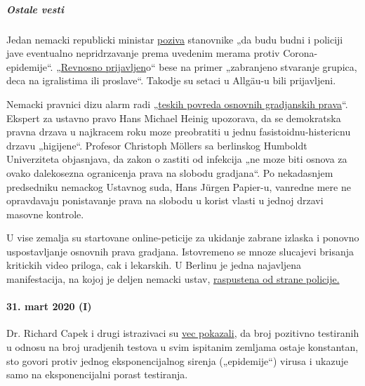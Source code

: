 \hypertarget{ostale-vesti}{%
\subparagraph{\texorpdfstring{\textbf{Ostale
vesti}}{Ostale vesti}}\label{ostale-vesti}}

Jedan nemacki republicki ministar
\href{https://de.nachrichten.yahoo.com/strobl-bürger-verstöße-gegen-corona-regeln-polizei-melden-095746341.html?guccounter=1\&guce_referrer=aHR0cHM6Ly9zd3Bycy5vcmcvY292aWQtMTkuaGlud2Vpcy1paS8\&guce_referrer_sig=AQAAAJVaaBhiC-cLtQEICEBkNWa4gI877p2SHKrJ-LrsojdMmHDRqmD1o16GD-gMGYWBcqEw1kotQgyNfK1u3rSR8nJWkkNBDaamOjNzpLUFAcU6MGRrpgxxWDyHz70vxqcw1sFwMu_EI0MbuHgRdzRFCEhV1JlnM1WsSdJVqi6abywn}{poziva}
stanovnike „da budu budni i policiji jave eventualno nepridrzavanje
prema uvedenim merama protiv Corona-epidemije``.
„\href{https://www.br.de/nachrichten/bayern/buerger-melden-eifrig-verstoesse-gegen-corona-regeln,RuGXp1h}{Revnosno
prijavljen}o`` bese na primer „zabranjeno stvaranje grupica, deca na
igralistima ili proslave``. Takodje su setaci u Allgäu-u bili
prijavljeni.

Nemacki pravnici dizu alarm radi
„\href{https://www.focus.de/politik/deutschland/corona-regelungen-der-regierung-medizin-darf-nicht-gefaehrlicher-sein-als-die-krankheit_id_11827625.html}{teskih
povreda osnovnih gradjanskih prava}``. Ekspert za ustavno pravo Hans
Michael Heinig upozorava, da se demokratska pravna drzava u najkracem
roku moze preobratiti u jednu fasistoidnu-histericnu drzavu „higijene``.
Profesor Christoph Möllers sa berlinskog Humboldt Univerziteta
objasnjava, da zakon o zastiti od infekcija „ne moze biti osnova za
ovako dalekosezna ogranicenja prava na slobodu gradjana``. Po
nekadasnjem predsedniku nemackog Ustavnog suda, Hans Jürgen Papier-u,
vanredne mere ne opravdavaju ponistavanje prava na slobodu u korist
vlasti u jednoj drzavi masovne kontrole.

U vise zemalja su startovane online-peticije za ukidanje zabrane izlaska
i ponovno uspostavljanje osnovnih prava gradjana. Istovremeno se mnoze
slucajevi brisanja kritickih video priloga, cak i lekarskih. U Berlinu
je jedna najavljena manifestacija, na kojoj je deljen nemacki ustav,
\href{https://www.heise.de/tp/features/Wenn-Demonstranten-zu-Gefaehrdern-erklaert-werden-4692869.html}{raspustena
od strane policije.}

\hypertarget{31-mart-2020-i}{%
\paragraph{31. mart 2020 (I)}\label{31-mart-2020-i}}

Dr. Richard Capek i drugi istrazivaci su
\href{https://coronadaten.wordpress.com/}{vec pokazali}, da broj
pozitivno testiranih u odnosu na broj uradjenih testova u svim ispitanim
zemljama ostaje konstantan, sto govori protiv jednog eksponencijalnog
sirenja („epidemije``) virusa i ukazuje samo na eksponencijalni porast
testiranja.

